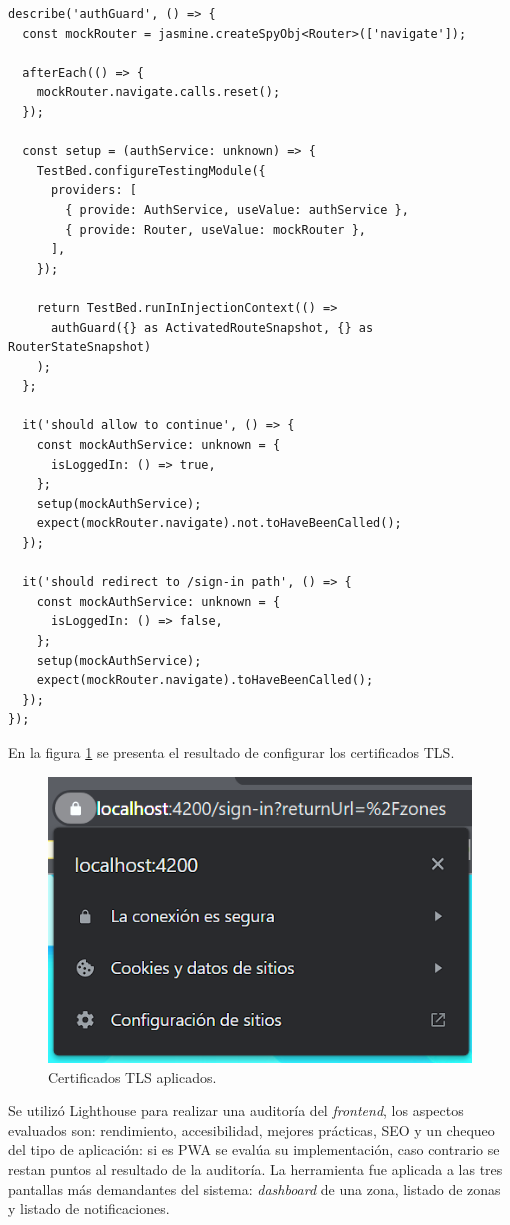 \newpage
\begin{lstlisting}[label=cod:unitTestFrontend,caption=Prueba unitaria del \emph{guard} de autenticación de rutas.]
describe('authGuard', () => {
  const mockRouter = jasmine.createSpyObj<Router>(['navigate']);

  afterEach(() => {
    mockRouter.navigate.calls.reset();
  });

  const setup = (authService: unknown) => {
    TestBed.configureTestingModule({
      providers: [
        { provide: AuthService, useValue: authService },
        { provide: Router, useValue: mockRouter },
      ],
    });

    return TestBed.runInInjectionContext(() =>
      authGuard({} as ActivatedRouteSnapshot, {} as RouterStateSnapshot)
    );
  };

  it('should allow to continue', () => {
    const mockAuthService: unknown = {
      isLoggedIn: () => true,
    };
    setup(mockAuthService);
    expect(mockRouter.navigate).not.toHaveBeenCalled();
  });

  it('should redirect to /sign-in path', () => {
    const mockAuthService: unknown = {
      isLoggedIn: () => false,
    };
    setup(mockAuthService);
    expect(mockRouter.navigate).toHaveBeenCalled();
  });
});
\end{lstlisting}

En la figura \ref{fig:certificadosTLSDelFrontendAplicados} se presenta el resultado de configurar los certificados TLS.

\begin{figure}[H]
	\centering
	\includegraphics[width=.5\textwidth]{./Figures/Frontend certificados TLS.png}
	\caption{Certificados TLS aplicados.}
	\label{fig:certificadosTLSDelFrontendAplicados}
\end{figure} 

Se utilizó Lighthouse para realizar una auditoría del \emph{frontend}, los aspectos evaluados son: rendimiento, accesibilidad, mejores prácticas, SEO y un chequeo del tipo de aplicación: si es PWA se evalúa su implementación, caso contrario se restan puntos al resultado de la auditoría. La herramienta fue aplicada a las tres pantallas más demandantes del sistema: \emph{dashboard} de una zona, listado de zonas y listado de notificaciones.

